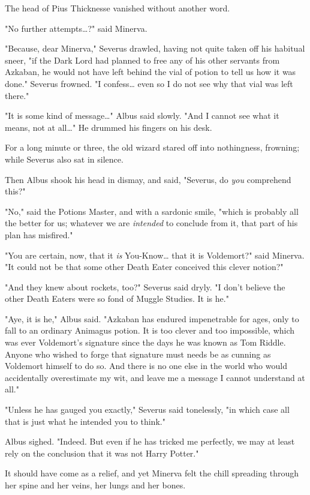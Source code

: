 The head of Pius Thicknesse vanished without another word.

"No further attempts{\ldots}?" said Minerva.

"Because, dear Minerva," Severus drawled, having not quite taken off his
habitual sneer, "if the Dark Lord had planned to free any of his other servants
from Azkaban, he would not have left behind the vial of potion to tell us how
it was done." Severus frowned. "I confess{\ldots} even so I do not see why that
vial was left there."

"It is some kind of message{\ldots}" Albus said slowly. "And I cannot see what
it means, not at all{\ldots}" He drummed his fingers on his desk.

For a long minute or three, the old wizard stared off into nothingness,
frowning; while Severus also sat in silence.

Then Albus shook his head in dismay, and said, "Severus, do \emph{you}
comprehend this?"

"No," said the Potions Master, and with a sardonic smile, "which is probably
all the better for us; whatever we are \emph{intended} to conclude from it,
that part of his plan has misfired."

"You are certain, now, that it \emph{is} You-Know{\ldots} that it is
Voldemort?" said Minerva. "It could not be that some other Death Eater
conceived this clever notion?"

"And they knew about rockets, too?" Severus said dryly. "I don't believe the
other Death Eaters were so fond of Muggle Studies. It is he."

"Aye, it is he," Albus said. "Azkaban has endured impenetrable for ages, only
to fall to an ordinary Animagus potion. It is too clever and too impossible,
which was ever Voldemort's signature since the days he was known as Tom Riddle.
Anyone who wished to forge that signature must needs be as cunning as Voldemort
himself to do so. And there is no one else in the world who would accidentally
overestimate my wit, and leave me a message I cannot understand at all."

"Unless he has gauged you exactly," Severus said tonelessly, "in which case all
that is just what he intended you to think."

Albus sighed. "Indeed. But even if he has tricked me perfectly, we may at least
rely on the conclusion that it was not Harry Potter."

It should have come as a relief, and yet Minerva felt the chill spreading
through her spine and her veins, her lungs and her bones.

